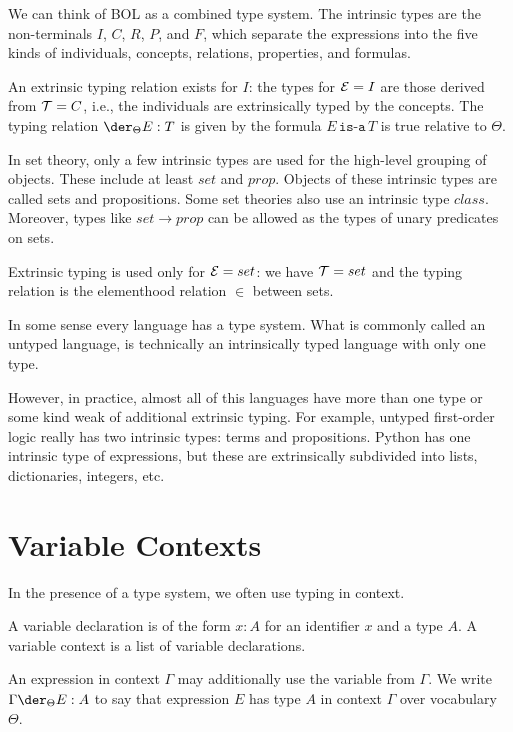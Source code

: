 \begin{example}
We can think of BOL as a combined type system.
The intrinsic types are the non-terminals $I$, $C$, $R$, $P$, and $F$, which separate the expressions into the five kinds of individuals, concepts, relations, properties, and formulas.

An extrinsic typing relation exists for $I$: the types for $\mathcal{E}=I$ are those derived from $\mathcal{T}=C$, i.e., the individuals are extrinsically typed by the concepts.
The typing relation $\der_\Theta E:T$ is given by the formula $E\,\texttt{is-a}\,T$ is true relative to $\Theta$.
\end{example}

\begin{example}
In set theory, only a few intrinsic types are used for the high-level grouping of objects.
These include at least $set$ and $prop$.
Objects of these intrinsic types are called sets and propositions.
Some set theories also use an intrinsic type $class$.
Moreover, types like $set\to prop$ can be allowed as the types of unary predicates on sets.

Extrinsic typing is used only for $\mathcal{E}=set$: we have $\mathcal{T}=set$ and the typing relation is the elementhood relation $\in$ between sets.
\end{example}

\begin{example}
In some sense every language has a type system.
What is commonly called an untyped language, is technically an intrinsically typed language with only one type.

However, in practice, almost all of this languages have more than one type or some kind weak of additional extrinsic typing.
For example, untyped first-order logic really has two intrinsic types: terms and propositions.
Python has one intrinsic type of expressions, but these are extrinsically subdivided into lists, dictionaries, integers, etc.
\end{example}


\section{Variable Contexts}

In the presence of a type system, we often use typing in context.

\begin{definition}[Context]
A variable declaration is of the form $x:A$ for an identifier $x$ and a type $A$.
A variable context is a list of variable declarations.

An expression in context $\Gamma$ may additionally use the variable from $\Gamma$.
We write $\Gamma \der_\Theta E:A$ to say that expression $E$ has type $A$ in context $\Gamma$ over vocabulary $\Theta$.
\end{definition}

